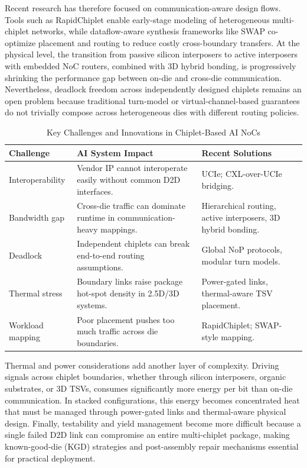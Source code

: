 Recent research has therefore focused on communication-aware design flows. Tools such as RapidChiplet enable early-stage modeling of heterogeneous multi-chiplet networks, while dataflow-aware synthesis frameworks like SWAP co-optimize placement and routing to reduce costly cross-boundary transfers. At the physical level, the transition from passive silicon interposers to active interposers with embedded NoC routers, combined with 3D hybrid bonding, is progressively shrinking the performance gap between on-die and cross-die communication. Nevertheless, deadlock freedom across independently designed chiplets remains an open problem because traditional turn-model or virtual-channel-based guarantees do not trivially compose across heterogeneous dies with different routing policies.

\begin{table}[!t]
\caption{Key Challenges and Innovations in Chiplet-Based AI NoCs}
\label{tab:chiplet}
\centering
\footnotesize
\setlength{\tabcolsep}{3pt}
\renewcommand{\arraystretch}{1.08}
\begin{tabularx}{\columnwidth}{p{1.7cm}Y p{1.5cm}}
\toprule
Challenge & AI System Impact & Recent Solutions \\
\midrule
Interoperability & Vendor IP cannot interoperate easily without common D2D interfaces. & UCIe; CXL-over-UCIe bridging. \\
Bandwidth gap & Cross-die traffic can dominate runtime in communication-heavy mappings. & Hierarchical routing, active interposers, 3D hybrid bonding. \\
Deadlock & Independent chiplets can break end-to-end routing assumptions. & Global NoP protocols, modular turn models. \\
Thermal stress & Boundary links raise package hot-spot density in 2.5D/3D systems. & Power-gated links, thermal-aware TSV placement. \\
Workload mapping & Poor placement pushes too much traffic across die boundaries. & RapidChiplet; SWAP-style mapping. \\
\bottomrule
\end{tabularx}
\end{table}

Thermal and power considerations add another layer of complexity. Driving signals across chiplet boundaries, whether through silicon interposers, organic substrates, or 3D TSVs, consumes significantly more energy per bit than on-die communication. In stacked configurations, this energy becomes concentrated heat that must be managed through power-gated links and thermal-aware physical design. Finally, testability and yield management become more difficult because a single failed D2D link can compromise an entire multi-chiplet package, making known-good-die (KGD) strategies and post-assembly repair mechanisms essential for practical deployment.
